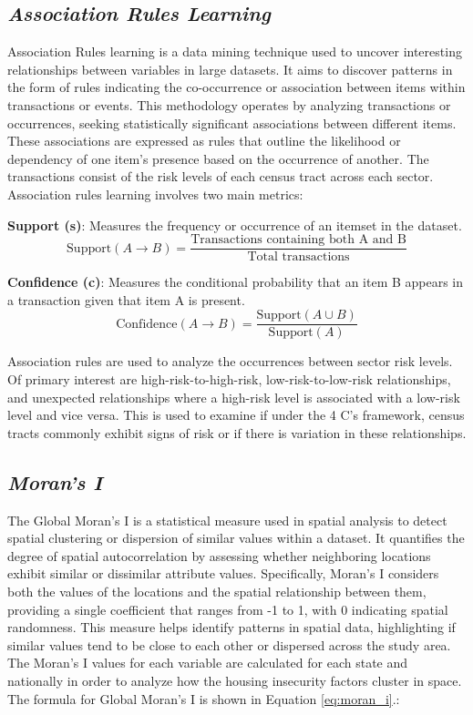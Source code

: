 \subsection{\textit{Association Rules Learning}}

Association Rules learning is a data mining technique used to uncover interesting relationships between variables in large datasets. It aims to discover patterns in the form of rules indicating the co-occurrence or association between items within transactions or events. This methodology operates by analyzing transactions or occurrences, seeking statistically significant associations between different items. These associations are expressed as rules that outline the likelihood or dependency of one item's presence based on the occurrence of another. The transactions consist of the risk levels of each census tract across each sector. Association rules learning involves two main metrics:

\textbf{Support (s)}: Measures the frequency or occurrence of an itemset in the dataset.
\[
\text{Support}(A \rightarrow B) = \frac{\text{Transactions containing both A and B}}{\text{Total transactions}}
\]

\textbf{Confidence (c)}: Measures the conditional probability that an item B appears in a transaction given that item A is present.
\[
\text{Confidence}(A \rightarrow B) = \frac{\text{Support}(A \cup B)}{\text{Support}(A)}
\]

Association rules are used to analyze the occurrences between sector risk levels. Of primary interest are high-risk-to-high-risk, low-risk-to-low-risk relationships, and unexpected relationships where a high-risk level is associated with a low-risk level and vice versa. This is used to examine if under the 4 C's framework, census tracts commonly exhibit signs of risk or if there is variation in these relationships.


\subsection{\textit{Moran's I}}
The Global Moran's I is a statistical measure used in spatial analysis to detect spatial clustering or dispersion of similar values within a dataset. It quantifies the degree of spatial autocorrelation by assessing whether neighboring locations exhibit similar or dissimilar attribute values. Specifically, Moran's I considers both the values of the locations and the spatial relationship between them, providing a single coefficient that ranges from -1 to 1, with 0 indicating spatial randomness. This measure helps identify patterns in spatial data, highlighting if similar values tend to be close to each other or dispersed across the study area. The Moran's I values for each variable are calculated for each state and nationally in order to analyze how the housing insecurity factors cluster in space. The formula for Global Moran's I is shown in Equation \ref{eq:moran_i}.:


